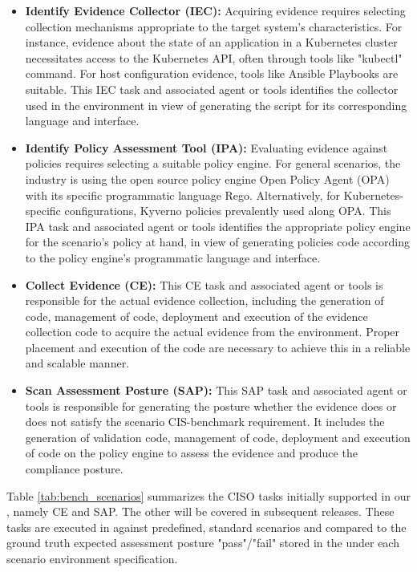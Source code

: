 \begin{itemize}
    \item \textbf{Identify Evidence Collector (IEC):} Acquiring evidence requires selecting collection mechanisms appropriate to the target system's characteristics. For instance, evidence about the state of an application in a Kubernetes cluster necessitates access to the Kubernetes API, often through tools like "kubectl" command. For host configuration evidence, tools like Ansible Playbooks are suitable. This IEC task and associated agent or tools identifies the collector used in the environment in view of generating the script for its corresponding language and interface.    
    
    \item \textbf{Identify Policy Assessment Tool (IPA):} Evaluating evidence against policies requires selecting a suitable policy engine. For general scenarios, the industry is using the open source policy engine Open Policy Agent (OPA)~\cite{Intro:OPA} with its specific programmatic language Rego. Alternatively, for Kubernetes-specific configurations, Kyverno policies prevalently used along OPA. This IPA task and associated agent or tools identifies the appropriate policy engine for the scenario's policy at hand, in view of generating policies code according to the policy engine's  programmatic language and interface.    
    
    \item \textbf{Collect Evidence (CE):} This CE task and associated agent or tools is responsible for the actual evidence collection, including the generation of code, management of code, deployment and execution of the evidence collection code to acquire the actual evidence from the environment. Proper placement and execution of the code are necessary to achieve this in a reliable and scalable manner.
    
    \item \textbf{Scan Assessment Posture (SAP):} This SAP task and associated agent or tools is responsible for generating the posture whether the evidence does or does not satisfy the scenario CIS-benchmark requirement. It includes the generation of validation code, management of code, deployment and execution of code on the policy engine to assess the evidence and produce the compliance posture.  
\end{itemize}

Table \ref{tab:bench_scenarios} summarizes the CISO tasks initially supported in our \bench, namely CE and SAP. The other will be covered in subsequent releases. 
These tasks are executed in \bench against predefined, standard scenarios and compared to the ground truth expected assessment posture "pass"/"fail" stored in the \bench under each scenario environment specification. 

